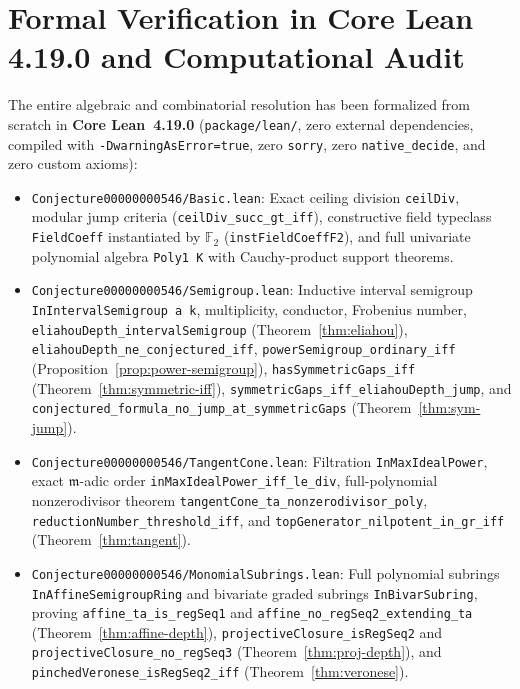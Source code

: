 \documentclass[11pt]{amsart}
\theoremstyle{definition}
\theoremstyle{remark}
\newcommand{\FF}{\mathbb{F}}
\newcommand{\mm}{\mathfrak{m}}
\begin{document}
\section{Formal Verification in Core Lean 4.19.0 and Computational Audit}
\label{sec:lean}

{\raggedright
The entire algebraic and combinatorial resolution has been formalized from scratch in \textbf{Core Lean~4.19.0} (\texttt{package/lean/}, zero external dependencies, compiled with \texttt{-DwarningAsError=true}, zero \texttt{sorry}, zero \texttt{native\_\allowbreak decide}, and zero custom axioms):
\begin{itemize}\raggedright
  \item \texttt{Conjecture00000000546/\allowbreak Basic.lean}: Exact ceiling division \texttt{ceilDiv}, modular jump criteria (\texttt{ceilDiv\_\allowbreak succ\_\allowbreak gt\_\allowbreak iff}), constructive field typeclass \texttt{FieldCoeff} instantiated by $\FF_2$ (\texttt{instFieldCoeffF2}), and full univariate polynomial algebra \texttt{Poly1 K} with Cauchy-product support theorems.
  \item \texttt{Conjecture00000000546/\allowbreak Semigroup.lean}: Inductive interval semigroup \texttt{InIntervalSemigroup a k}, multiplicity, conductor, Frobenius number, \texttt{eliahouDepth\_\allowbreak intervalSemigroup} (Theorem~\ref{thm:eliahou}), \texttt{eliahouDepth\_\allowbreak ne\_\allowbreak conjectured\_\allowbreak iff}, \texttt{powerSemigroup\_\allowbreak ordinary\_\allowbreak iff} (Proposition~\ref{prop:power-semigroup}), \texttt{hasSymmetricGaps\_\allowbreak iff} (Theorem~\ref{thm:symmetric-iff}), \texttt{symmetricGaps\_\allowbreak iff\_\allowbreak eliahouDepth\_\allowbreak jump}, and \texttt{conjectured\_\allowbreak formula\_\allowbreak no\_\allowbreak jump\_\allowbreak at\_\allowbreak symmetricGaps} (Theorem~\ref{thm:sym-jump}).
  \item \texttt{Conjecture00000000546/\allowbreak TangentCone.lean}: Filtration \texttt{InMaxIdealPower}, exact $\mm$-adic order \texttt{inMaxIdealPower\_\allowbreak iff\_\allowbreak le\_\allowbreak div}, full-polynomial nonzerodivisor theorem \texttt{tangentCone\_\allowbreak ta\_\allowbreak nonzerodivisor\_\allowbreak poly}, \texttt{reductionNumber\_\allowbreak threshold\_\allowbreak iff}, and \texttt{topGenerator\_\allowbreak nilpotent\_\allowbreak in\_\allowbreak gr\_\allowbreak iff} (Theorem~\ref{thm:tangent}).
  \item \texttt{Conjecture00000000546/\allowbreak MonomialSubrings.lean}: Full polynomial subrings \texttt{InAffineSemigroupRing} and bivariate graded subrings \texttt{InBivarSubring}, proving \texttt{affine\_\allowbreak ta\_\allowbreak is\_\allowbreak regSeq1} and \texttt{affine\_\allowbreak no\_\allowbreak regSeq2\_\allowbreak extending\_\allowbreak ta} (Theorem~\ref{thm:affine-depth}), \texttt{projectiveClosure\_\allowbreak isRegSeq2} and \texttt{projectiveClosure\_\allowbreak no\_\allowbreak regSeq3} (Theorem~\ref{thm:proj-depth}), and \texttt{pinchedVeronese\_\allowbreak isRegSeq2\_\allowbreak iff} (Theorem~\ref{thm:veronese}).

\end{itemize}}
\end{document}
